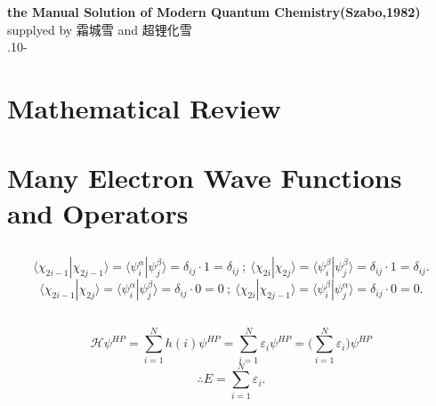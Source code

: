 \documentclass[UTF8]{ctexart}
\begin{document}
	\begin{titlepage}	
		\vspace*{\fill}
		\begin{center}
			\normalfont
			\setlength\lineskip{5bp}
			{\bfseries the Manual Solution of Modern Quantum Chemistry(Szabo,1982)}
			\bigskip \\
			{\Large supplyed by 霜城雪 and 超锂化雪}\\
			.10-\\
			\setcounter{tocdepth}{1}
			\tableofcontents
		\end{center}
	\end{titlepage}

	\section{Mathematical Review}
	
	\subsection{}

\section{Many Electron Wave Functions and Operators}
	\subsection{}
		\[
			\langle \chi _{2i-1} | \chi _{2j-1} \rangle = \langle \psi_i^\alpha |\psi_j^\beta \rangle = \delta_{ij} \cdot 1 = \delta_{ij} \ ; \
			\langle \chi _{2i} | \chi _{2j} \rangle = \langle \psi_i^\beta |\psi_j^\beta \rangle = \delta_{ij} \cdot 1 = \delta_{ij}.
		\]
		\[
		\langle \chi _{2i-1} | \chi _{2j} \rangle = \langle \psi_i^\alpha |\psi_j^\beta \rangle = \delta_{ij} \cdot 0 = 0 \ ; \
		\langle \chi _{2i} | \chi _{2j-1} \rangle = \langle \psi_i^\beta |\psi_j^\alpha \rangle = \delta_{ij} \cdot 0 = 0.
		\]
	
	\subsection{}
		\[
			\mathscr{H} \psi^{HP} = \sum_{i=1}^N h(i) \psi^{HP} = \sum_{i=1}^N \varepsilon_i \psi^{HP} = \Big(\sum_{i=1}^N \varepsilon_i \Big) \psi^{HP}
		\]
		\[
			\therefore E = \sum_{i=1}^N \varepsilon_i.
		\]
	
\end{document}

